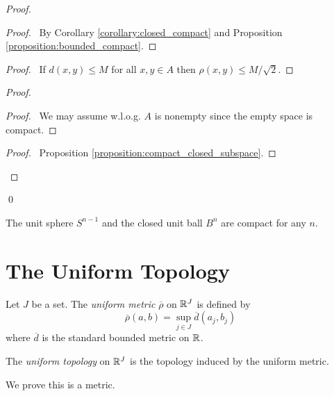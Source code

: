 \begin{proof}
    \pf
    \begin{proof}
        \pf\ By Corollary \ref{corollary:closed_compact} and Proposition \ref{proposition:bounded_compact}.
    \end{proof}
    \begin{proof}
        \pf\ If $d(x,y) \leq M$ for all $x,y \in A$ then $\rho(x,y) \leq M / \sqrt{2}$.
    \end{proof}
    \begin{proof}
        \begin{proof}
            \pf\ We may assume w.l.o.g. $A$ is nonempty since the empty space is compact.
        \end{proof}
        \begin{proof}
            \pf\ Proposition \ref{proposition:compact_closed_subspace}.
        \end{proof}
    \end{proof}
    \qed
\end{proof}

\begin{corollary}
    The unit sphere $S^{n-1}$ and the closed unit ball $B^n$ are compact for any $n$.
\end{corollary}

\section{The Uniform Topology}

\begin{definition}
    Let $J$ be a set. The \emph{uniform metric} $\overline{\rho}$ on $\mathbb{R}^J$ is defined by
    \[ \overline{\rho}(a,b) = \sup_{j \in J} \overline{d}(a_j, b_j) \]
    where $\overline{d}$ is the standard bounded metric on $\mathbb{R}$.

    The \emph{uniform topology} on $\mathbb{R}^J$ is the topology induced by the uniform metric.
\end{definition}

We prove this is a metric.


